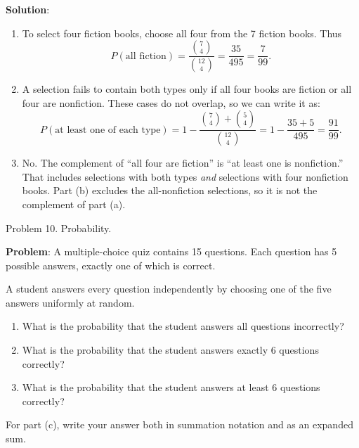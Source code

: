 \documentclass{article}
\begin{document}
\textbf{Solution}:
\begin{enumerate}[label=(\alph*)]
  \item To select four fiction books, choose all four from the
  7 fiction books. Thus
  $$
  P(\text{all fiction})
  =\frac{\binom{7}{4}}{\binom{12}{4}}
  =\frac{35}{495}
  =\frac{7}{99}.
  $$

  \item A selection fails to contain both types only if all four
  books are fiction or all four are nonfiction. These cases do not
  overlap, so we can write it as:
  $$
  P(\text{at least one of each type})
  =1-\frac{\binom{7}{4}+\binom{5}{4}}{\binom{12}{4}}
  =1-\frac{35+5}{495}
  =\frac{91}{99}.
  $$

  \item No. The complement of ``all four are fiction'' is
  ``at least one is nonfiction.'' That includes selections with
  both types \emph{and} selections with four nonfiction books.
  Part (b) excludes the all-nonfiction selections, so it is
  not the complement of part (a).
\end{enumerate}

Problem 10. Probability.

\textbf{Problem}: A multiple-choice quiz contains 15 questions. Each question has 5 possible answers, exactly one of which is correct.

A student answers every question independently by choosing one of the five answers uniformly at random.

\begin{enumerate}[label=(\alph*)]
  \item What is the probability that the student answers all questions incorrectly?
  \item What is the probability that the student answers exactly 6 questions correctly?
  \item What is the probability that the student answers at least 6 questions correctly?
\end{enumerate}
For part (c), write your answer both in summation notation and as an expanded sum.
\end{document}
